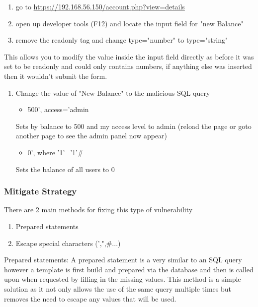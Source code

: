 \documentclass[titlepage]{article}
\begin{document}
      \begin{enumerate}
         \item go to \url{https://192.168.56.150/account.php?view=details}
         \item open up developer tools (F12) and locate the input field for "new Balance"
         \item remove the readonly tag and change type="number" to type="string"
      \end{enumerate}
         This allows you to modify the value inside the input field directly as before it was set to be readonly and could only contains numbers, if anything else was inserted then it wouldn't submit the form. 
      \begin{enumerate}[resume]
         \item Change the value of "New Balance" to the malicious SQL query 
         \begin{itemize}
            \item 500', access='admin
         \end{itemize}
            Sets by balance to 500 and my access level to admin (reload the page or goto another page to see the admin panel now appear)
         \begin{itemize}[resume]
            \item 0', where '1'='1'\#
         \end{itemize}
            Sets the balance of all users to 0
      \end{enumerate}


      \subsubsection{Mitigate Strategy} %
      \label{ssub:sql_injection_mitigate_strategy}
      
      There are 2 main methods for fixing this type of vulnerability

      \begin{enumerate}
         \item Prepared statements
         \item Escape special characters (',",\#...)
      \end{enumerate}

      Prepared statements: A prepared statement is a very similar to an SQL query however a template is first build and prepared via the database and then is called upon when requested by filling in the missing values. This method is a simple solution as it not only allows the use of the same query multiple times but removes the need to escape any values that will be used.
\end{document}
